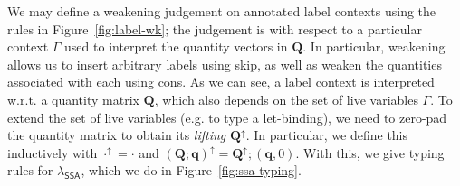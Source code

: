 \documentclass[acmsmall,screen,anonymous,review]{acmart}
\newcommand{\mb}[1]{\ensuremath{\mathbf{#1}}}
\newcommand{\ms}[1]{\ensuremath{\mathsf{#1}}}
\newcommand{\lwk}[3]{#1 \vdash #2 \rightsquigarrow #3}
\newcommand{\rle}[1]{{\scriptsize\textsf{#1}}}
\newcommand{\brle}[1]{{\textsf{#1}}}
\newcommand{\subiterexp}{\texorpdfstring{\(\lambda_{\ms{iter}}\)}{lambda-iter}}
\newcommand{\isotopessa}{\(\lambda_{\ms{SSA}}\)}
\newcommand{\zeroqv}[1]{#1^\uparrow}
\begin{document}
We may define a weakening judgement on annotated label contexts using the rules in
Figure~\ref{fig:label-wk}; the judgement is with respect to a particular context $\Gamma$ used to
interpret the quantity vectors in $\mb{Q}$. In particular, weakening allows us to  insert arbitrary
labels using \brle{skip}, as well as weaken the quantities associated with each using \brle{cons}.
As we can see, a label context is interpreted w.r.t. a quantity matrix $\mb{Q}$, which also depends
on the set of live variables $\Gamma$. To extend the set of live variables (e.g. to type a
let-binding), we need to zero-pad the quantity matrix to obtain its \emph{lifting}
$\zeroqv{\mb{Q}}$. In particular, we define this inductively with 
$
  \zeroqv{\cdot} = \cdot
$ and
$
  \zeroqv{(\mb{Q}; \mb{q})} = \zeroqv{\mb{Q}} ; (\mb{q}, 0)
$.
%
%
With this, we give typing rules for \isotopessa{}, which we do in Figure~\ref{fig:ssa-typing}.
\end{document}
